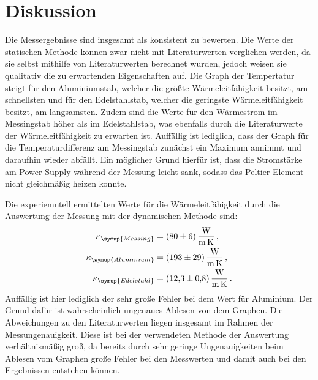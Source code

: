 \section{Diskussion}
\label{sec:Diskussion}
Die Messergebnisse sind insgesamt als konsistent zu bewerten.
Die Werte der statischen Methode können zwar nicht mit Literaturwerten verglichen werden,
da sie selbst mithilfe von Literaturwerten berechnet wurden, jedoch weisen sie
qualitativ die zu erwartenden Eigenschaften auf. Die Graph der Tempertatur steigt für
den Aluminiumstab, welcher die größte Wärmeleitfähigkeit besitzt, am schnellsten und
für den Edelstahlstab, welcher die geringste Wärmeleitfähigkeit besitzt, am langsamsten.
Zudem sind die Werte für den Wärmestrom im Messingstab höher als im Edelstahlstab,
was ebenfalls durch die Literaturwerte der Wärmeleitfähigkeit zu erwarten ist.
Auffällig ist lediglich, dass der Graph für die Temperaturdifferenz am Messingstab
zunächst ein Maximum annimmt und daraufhin wieder abfällt. Ein möglicher Grund hierfür
ist, dass die Stromstärke am Power Supply während der Messung leicht sank, sodass
das Peltier Element nicht gleichmäßig heizen konnte.


Die experiemntell ermittelten Werte für die Wärmeleitfähigkeit durch die Auswertung
der Messung mit der dynamischen Methode sind:
\begin{align}
  \kappa_{\symup{Messing}} &= \SI{80(6)}{\watt\per\meter\per\kelvin}\,,\nonumber \\
  \kappa_{\symup{Aluminium}} &= \SI{193(29)}{\watt\per\meter\per\kelvin}\,,\nonumber \\
  \kappa_{\symup{Edelstahl}} &= \SI{12.3(08)}{\watt\per\meter\per\kelvin}\,.\nonumber
\end{align}
Auffällig ist hier lediglich der sehr große Fehler bei dem Wert für Aluminium. Der Grund dafür
ist wahrscheinlich ungenaues Ablesen von dem Graphen.
Die Abweichungen zu den Literaturwerten liegen insgesamt im Rahmen der Messungenauigkeit.
Diese ist bei der verwendeten Methode der Auswertung verhältnismäßig groß, da bereits
durch sehr geringe Ungenauigkeiten beim Ablesen vom Graphen große Fehler bei den
Messwerten und damit auch bei den Ergebnissen entstehen können.
